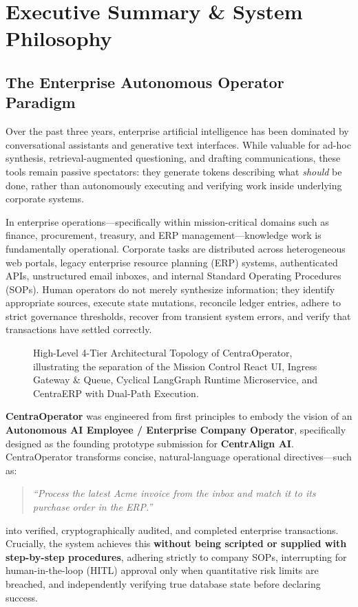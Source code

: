 \section{Executive Summary \& System Philosophy}
\label{sec:executive_summary}

\subsection{The Enterprise Autonomous Operator Paradigm}
Over the past three years, enterprise artificial intelligence has been dominated by conversational assistants and generative text interfaces. While valuable for ad-hoc synthesis, retrieval-augmented questioning, and drafting communications, these tools remain passive spectators: they generate tokens describing what \textit{should} be done, rather than autonomously executing and verifying work inside underlying corporate systems.

In enterprise operations---specifically within mission-critical domains such as finance, procurement, treasury, and ERP management---knowledge work is fundamentally operational. Corporate tasks are distributed across heterogeneous web portals, legacy enterprise resource planning (ERP) systems, authenticated APIs, unstructured email inboxes, and internal Standard Operating Procedures (SOPs). Human operators do not merely synthesize information; they identify appropriate sources, execute state mutations, reconcile ledger entries, adhere to strict governance thresholds, recover from transient system errors, and verify that transactions have settled correctly.

\begin{figure}[htbp]
  \centering
  
  \caption{High-Level 4-Tier Architectural Topology of CentraOperator, illustrating the separation of the Mission Control React UI, Ingress Gateway \& Queue, Cyclical LangGraph Runtime Microservice, and CentraERP with Dual-Path Execution.}
  \label{fig:arch_topology}
\end{figure}

\textbf{CentraOperator} was engineered from first principles to embody the vision of an \textbf{Autonomous AI Employee / Enterprise Company Operator}, specifically designed as the founding prototype submission for \textbf{CentrAlign AI}. CentraOperator transforms concise, natural-language operational directives---such as:
\begin{quote}
\textit{``Process the latest Acme invoice from the inbox and match it to its purchase order in the ERP.''}
\end{quote}
into verified, cryptographically audited, and completed enterprise transactions. Crucially, the system achieves this \textbf{without being scripted or supplied with step-by-step procedures}, adhering strictly to company SOPs, interrupting for human-in-the-loop (HITL) approval only when quantitative risk limits are breached, and independently verifying true database state before declaring success.

